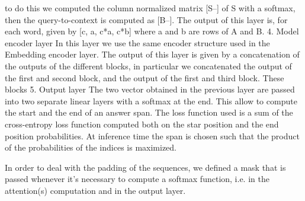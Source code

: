 to do this we computed the column normalized matrix [S--] of S with a softmax, then the query-to-context is computed as [B--].
The output of this layer is, for each word, given by [c, a, c*a, c*b] where a and b are rows of A and B. 
4. Model encoder layer
In this layer we use the same encoder structure used in the Embedding encoder layer. The output of this layer is given by a concatenation of the outputs of the different blocks, in particular we concatenated
the output of the first and second block, and the output of the first and third block. These blocks 
5. Output layer
The two vector obtained in the previous layer are passed into two separate linear layers with a softmax at the end. This allow to compute the start and the end of an answer span. The loss function used
is a sum of the cross-entropy loss function computed both on the star position and the end position probabilities.
At inference time the span is chosen such that the product of the probabilities of the indices is maximized.

In order to deal with the padding of the sequences, we defined a mask that is passed whenever it's necessary to compute a softmax function, i.e. in the attention(s) computation and in the output layer.
